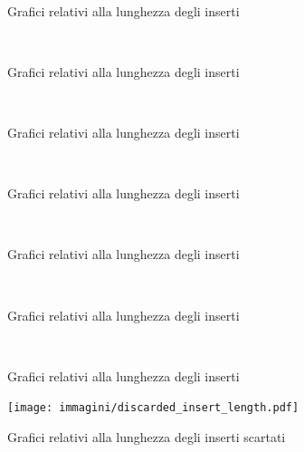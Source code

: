 \begin{figure}[htbp]
\centering
{} \quad
{} \\
\caption{Grafici relativi alla lunghezza degli inserti}
\end{figure}
\begin{figure}[htbp]
\ContinuedFloat
\centering
{} \\
\caption{Grafici relativi alla lunghezza degli inserti}
\end{figure}
\begin{figure}[htbp]
\ContinuedFloat
\centering
{} \quad
{} \\
\caption{Grafici relativi alla lunghezza degli inserti}
\end{figure}
\begin{figure}[htbp]
\ContinuedFloat
\centering
{} \quad
{} \\
\caption{Grafici relativi alla lunghezza degli inserti}
\end{figure}
\begin{figure}[htbp]
\ContinuedFloat
\centering
{} \\
\caption{Grafici relativi alla lunghezza degli inserti}
\end{figure}
\begin{figure}[htbp]
\ContinuedFloat
\centering
{} \quad
{} \\
\caption{Grafici relativi alla lunghezza degli inserti}
\end{figure}
\begin{figure}[htbp]
\ContinuedFloat
\centering
{} \\
\caption{Grafici relativi alla lunghezza degli inserti}
\end{figure}
\begin{figure}[htbp]
\centering
\texttt{[image: immagini/discarded\_insert\_length.pdf]}
\caption{Grafici relativi alla lunghezza degli inserti scartati}
\label{fig:discarded insert length}
\end{figure}